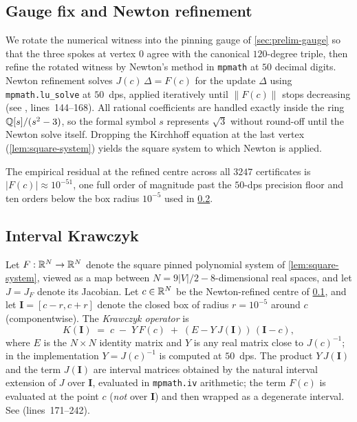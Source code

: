 \subsection{Gauge fix and Newton refinement}
\label{sec:certification-refine}

We rotate the numerical witness into the pinning gauge of
\cref{sec:prelim-gauge} so that the three spokes at vertex $0$ agree
with the canonical $120$-degree triple, then refine the rotated
witness by Newton's method in \texttt{mpmath} at $50$ decimal digits.
Newton refinement solves
$J(c)\,\Delta = F(c)$ for the update $\Delta$ using
\texttt{mpmath.lu\_solve} at $50$~dps, applied iteratively until
$\lVert F(c) \rVert$ stops decreasing (see
, lines~144--168). All
rational coefficients are handled exactly inside the ring
$\mathbb{Q}[s]/(s^{2} - 3)$, so the formal symbol $s$ represents $\sqrt{3}$
without round-off until the Newton solve itself. Dropping the
Kirchhoff equation at the last vertex (\cref{lem:square-system})
yields the square system to which Newton is applied.

The empirical residual at the refined centre across all $3247$
certificates is $\lvert F(c) \rvert \approx 10^{-51}$, one full order
of magnitude past the $50$-dps precision floor and ten orders below
the box radius $10^{-5}$ used in \cref{sec:certification-krawczyk}.

\subsection{Interval Krawczyk}
\label{sec:certification-krawczyk}

Let $F : \mathbb{R}^{N} \to \mathbb{R}^{N}$ denote the square pinned polynomial
system of \cref{lem:square-system}, viewed as a map between
$N = 9|V|/2 - 8$-dimensional real spaces, and let $J = J_F$ denote
its Jacobian. Let $c \in \mathbb{R}^{N}$ be the Newton-refined centre of
\cref{sec:certification-refine}, and let
$\mathbf{I} = [c - r, c + r]$ denote the closed box of radius
$r = 10^{-5}$ around $c$ (componentwise). The \emph{Krawczyk operator}
is
\begin{equation}
\label{eq:krawczyk-operator}
   K(\mathbf{I}) \;=\; c \;-\; Y\,F(c) \;+\; (E - Y\,J(\mathbf{I}))\,(\mathbf{I} - c),
\end{equation}
where $E$ is the $N \times N$ identity matrix and $Y$ is any real
matrix close to $J(c)^{-1}$; in the implementation
$Y = J(c)^{-1}$ is computed at $50$~dps. The product $Y\,J(\mathbf{I})$
and the term $J(\mathbf{I})$ are interval matrices obtained by the
natural interval extension of $J$ over $\mathbf{I}$, evaluated in
\texttt{mpmath.iv} arithmetic; the term $F(c)$ is evaluated at the
point $c$ (\emph{not} over $\mathbf{I}$) and then wrapped as a
degenerate interval. See 
(lines~171--242).


